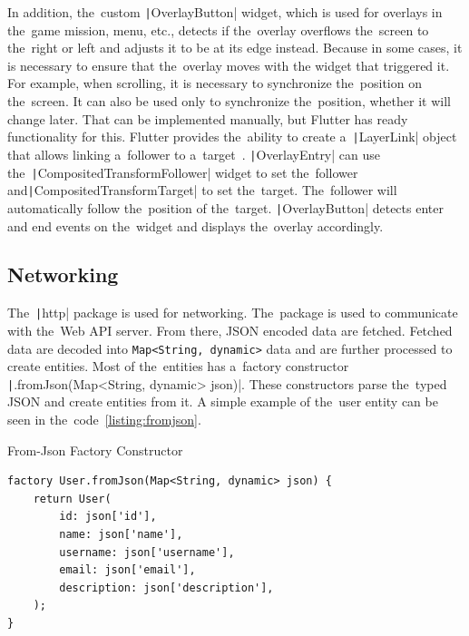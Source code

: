 In addition, the~custom \texttt|OverlayButton| widget, which is used for overlays in the~game mission, menu, etc., detects if the~overlay overflows the~screen to the~right or left and adjusts it to be at its edge instead.
Because in some cases, it is necessary to ensure that the~overlay moves with the \mbox{widget} that triggered it.
For example, when scrolling, it is necessary to synchronize the~position on the~screen.
It can also be used only to synchronize the~position, whether it will change later.
That can be implemented \mbox{manually}, but Flutter has ready functionality for this.
Flutter provides the~ability to create a~\texttt|LayerLink| object that allows linking a~follower to a~target~\cite{a2022_material}.
\texttt|OverlayEntry| can use the~\texttt|CompositedTransformFollower| widget to set the~follower and\linebreak{}\texttt|CompositedTransformTarget| to set the~target.
The~follower will automatically follow the~position of the~target.
\texttt|OverlayButton| detects enter and end events on the~widget and displays the~overlay accordingly.

\subsection{Networking}

The~\texttt|http| package is used for networking.
The~package is used to communicate with the~Web API server.
From there, JSON encoded data are fetched.
Fetched data are decoded into \texttt{Map<String, dynamic>} data and are further processed to create entities.
Most of the~entities has a~factory constructor \texttt|.fromJson(Map<String, dynamic> json)|.
These constructors parse the~typed JSON and create entities from it.
A simple example of the~user entity can be seen in the~code~\ref{listing:fromjson}.

\begin{listing}
    \caption{From-Json Factory Constructor}
    \label{listing:fromjson}
    \begin{verbatim}
factory User.fromJson(Map<String, dynamic> json) {
    return User(
        id: json['id'],
        name: json['name'],
        username: json['username'],
        email: json['email'],
        description: json['description'],
    );
}
    \end{verbatim}
\end{listing}

